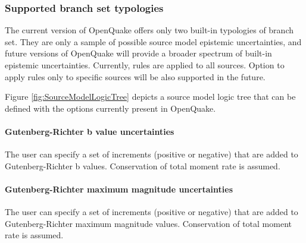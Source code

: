 \subsubsection{Supported branch set typologies}
The current version of OpenQuake offers only two built-in typologies of 
branch set. They are only a sample of possible source model epistemic 
uncertainties, and future versions of OpenQuake will provide a broader 
spectrum of built-in epistemic uncertainties. 
%
Currently, rules are applied to all sources. Option to apply rules only 
to specific sources will be also supported in the future.

Figure \ref{fig:SourceModelLogicTree} depicts a source model logic tree that 
can be defined with the options currently present in OpenQuake.
%
\paragraph{Gutenberg-Richter b value uncertainties}
The user can specify a set of increments (positive or negative) that are 
added to Gutenberg-Richter b values. Conservation of total moment rate 
is assumed.
%
\paragraph{Gutenberg-Richter maximum magnitude uncertainties}
The user can specify a set of increments (positive or negative) that are 
added to Gutenberg-Richter maximum magnitude values. 
Conservation of total moment rate is assumed.